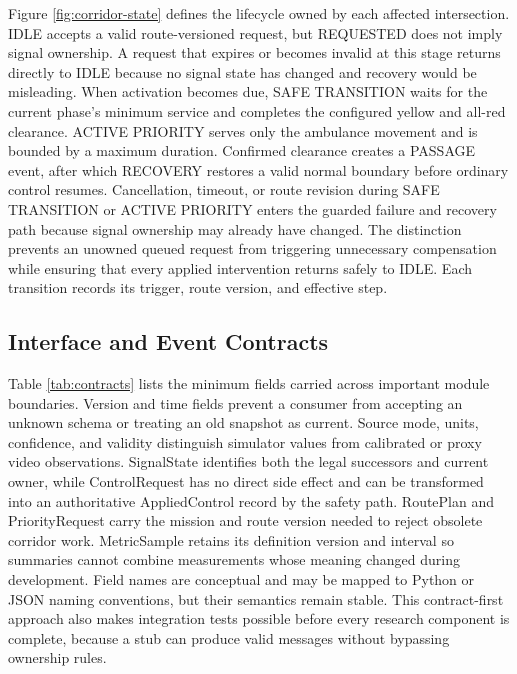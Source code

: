 Figure \ref{fig:corridor-state} defines the lifecycle owned by each affected intersection. IDLE accepts a valid route-versioned request, but REQUESTED does not imply signal ownership. A request that expires or becomes invalid at this stage returns directly to IDLE because no signal state has changed and recovery would be misleading. When activation becomes due, SAFE TRANSITION waits for the current phase's minimum service and completes the configured yellow and all-red clearance. ACTIVE PRIORITY serves only the ambulance movement and is bounded by a maximum duration. Confirmed clearance creates a PASSAGE event, after which RECOVERY restores a valid normal boundary before ordinary control resumes. Cancellation, timeout, or route revision during SAFE TRANSITION or ACTIVE PRIORITY enters the guarded failure and recovery path because signal ownership may already have changed. The distinction prevents an unowned queued request from triggering unnecessary compensation while ensuring that every applied intervention returns safely to IDLE. Each transition records its trigger, route version, and effective step.

\subsection{Interface and Event Contracts}

Table \ref{tab:contracts} lists the minimum fields carried across important module boundaries. Version and time fields prevent a consumer from accepting an unknown schema or treating an old snapshot as current. Source mode, units, confidence, and validity distinguish simulator values from calibrated or proxy video observations. SignalState identifies both the legal successors and current owner, while ControlRequest has no direct side effect and can be transformed into an authoritative AppliedControl record by the safety path. RoutePlan and PriorityRequest carry the mission and route version needed to reject obsolete corridor work. MetricSample retains its definition version and interval so summaries cannot combine measurements whose meaning changed during development. Field names are conceptual and may be mapped to Python or JSON naming conventions, but their semantics remain stable. This contract-first approach also makes integration tests possible before every research component is complete, because a stub can produce valid messages without bypassing ownership rules.

